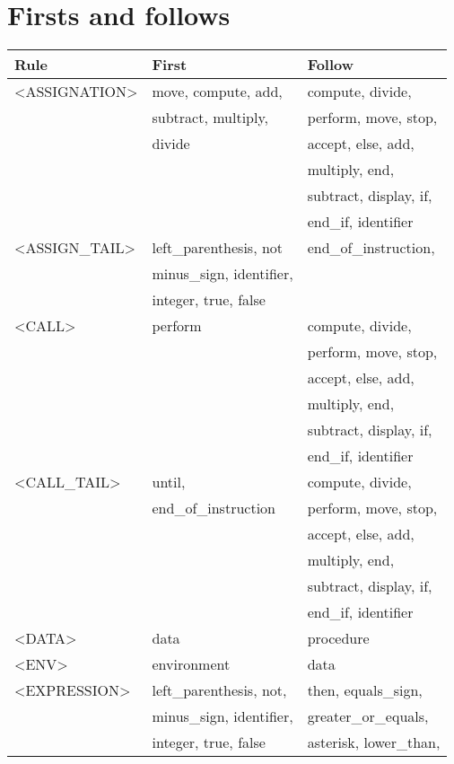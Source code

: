 \newpage\cleardoublepage{}
\section{Firsts and follows}
\label{app:firsts and follows}

\begin{longtable}{|l|l|l|}
\hline
Rule                 &   First                &   Follow               \\
\hline
<ASSIGNATION>  &  move, compute, add, &   compute, divide, \\ 
  &  subtract, multiply, &   perform, move, stop, \\ 
  &  divide &   accept, else, add, \\ 
  &  &   multiply, end, \\ 
  &  &   subtract, display, if, \\ 
  &  &   end\_if, identifier \\ 
  \hline
<ASSIGN\_TAIL>  &  left\_parenthesis, not &   end\_of\_instruction, \\ 
  &  minus\_sign, identifier, &   \\ 
  &  integer, true, false &   \\ 
  \hline
<CALL>  &  perform &   compute, divide, \\ 
  &  &   perform, move, stop, \\ 
  &  &   accept, else, add, \\ 
  &  &   multiply, end, \\ 
  &  &   subtract, display, if, \\ 
  &  &   end\_if, identifier \\ 
  \hline
<CALL\_TAIL>  &  until, &   compute, divide, \\ 
  &  end\_of\_instruction &   perform, move, stop, \\ 
  &  &   accept, else, add, \\ 
  &  &   multiply, end, \\ 
  &  &   subtract, display, if, \\ 
  &  &   end\_if, identifier \\ 
  \hline
<DATA>  &  data &   procedure \\ 
  \hline
<ENV>  &  environment &   data \\ 
  \hline
<EXPRESSION>  &  left\_parenthesis, not, &   then, equals\_sign, \\ 
  &  minus\_sign, identifier, &   greater\_or\_equals, \\ 
  &  integer, true, false &   asterisk, lower\_than, \\ 

\end{longtable}
